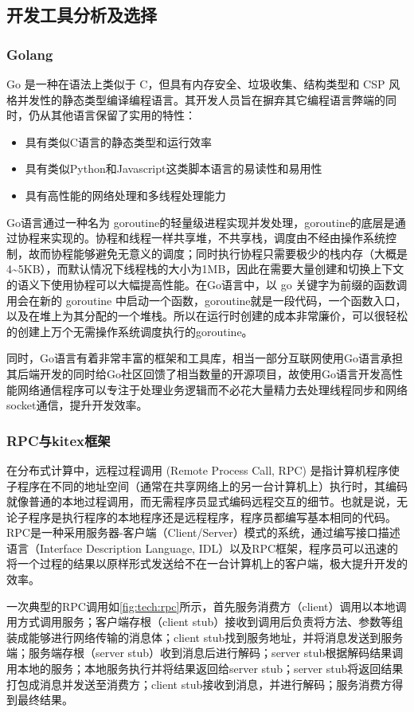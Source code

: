 \documentclass[supercite]{HustGraduPaper}
\newcommand{\rfig}[1]{\autoref{fig:#1}}
\theoremstyle{definition}
\begin{document}
\subsection{开发工具分析及选择}
\subsubsection{Golang}
Go 是一种在语法上类似于 C，但具有内存安全、垃圾收集、结构类型和 CSP\cite{roscoe1998theory} 风格并发性的静态类型编译编程语言。其开发人员旨在摒弃其它编程语言弊端的同时，仍从其他语言保留了实用的特性：
\begin{itemize}
  \item 具有类似C语言的静态类型和运行效率
  \item 具有类似Python和Javascript这类脚本语言的易读性和易用性
  \item 具有高性能的网络处理和多线程处理能力
\end{itemize}

Go语言通过一种名为 goroutine的轻量级进程实现并发处理，goroutine的底层是通过协程来实现的。协程和线程一样共享堆，不共享栈，调度由不经由操作系统控制，故而协程能够避免无意义的调度；同时执行协程只需要极少的栈内存（大概是4\textasciitilde 5KB），而默认情况下线程栈的大小为1MB，因此在需要大量创建和切换上下文的语义下使用协程可以大幅提高性能。在Go语言中，以 go 关键字为前缀的函数调用会在新的 goroutine 中启动一个函数，goroutine就是一段代码，一个函数入口，以及在堆上为其分配的一个堆栈。所以在运行时创建的成本非常廉价，可以很轻松的创建上万个无需操作系统调度执行的goroutine。

同时，Go语言有着非常丰富的框架和工具库，相当一部分互联网使用Go语言承担其后端开发的同时给Go社区回馈了相当数量的开源项目，故使用Go语言开发高性能网络通信程序可以专注于处理业务逻辑而不必花大量精力去处理线程同步和网络socket通信，提升开发效率。
\subsubsection{RPC与kitex框架}
在分布式计算中，远程过程调用 (Remote Process Call, RPC) 是指计算机程序使子程序在不同的地址空间（通常在共享网络上的另一台计算机上）执行时，其编码就像普通的本地过程调用，而无需程序员显式编码远程交互的细节。也就是说，无论子程序是执行程序的本地程序还是远程程序，程序员都编写基本相同的代码。RPC是一种采用服务器-客户端（Client/Server）模式的系统，通过编写接口描述语言（Interface Description Language, IDL）以及RPC框架，程序员可以迅速的将一个过程的结果以原样形式发送给不在一台计算机上的客户端，极大提升开发的效率。

一次典型的RPC调用如\rfig{tech:rpc}所示，首先服务消费方（client）调用以本地调用方式调用服务；客户端存根（client stub）接收到调用后负责将方法、参数等组装成能够进行网络传输的消息体；client stub找到服务地址，并将消息发送到服务端；服务端存根（server stub）收到消息后进行解码；server stub根据解码结果调用本地的服务；本地服务执行并将结果返回给server stub；server stub将返回结果打包成消息并发送至消费方；client stub接收到消息，并进行解码；服务消费方得到最终结果。
\end{document}
